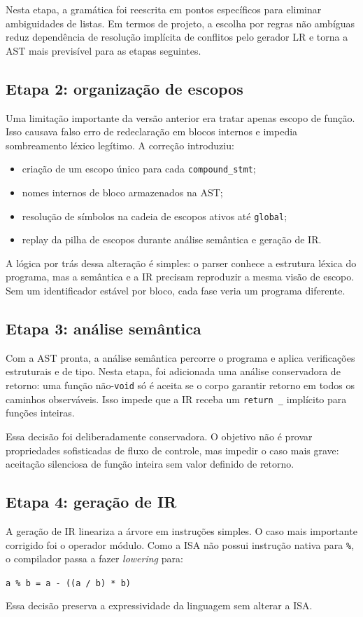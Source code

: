 \documentclass[12pt,a4paper]{article}
\begin{document}
Nesta etapa, a gramática foi reescrita em pontos específicos para eliminar ambiguidades de listas. Em termos de projeto, a escolha por regras não ambíguas reduz dependência de resolução implícita de conflitos pelo gerador LR e torna a AST mais previsível para as etapas seguintes.

\subsection{Etapa 2: organização de escopos}
Uma limitação importante da versão anterior era tratar apenas escopo de função. Isso causava falso erro de redeclaração em blocos internos e impedia sombreamento léxico legítimo. A correção introduziu:
\begin{itemize}[leftmargin=1.5em]
    \item criação de um escopo único para cada \texttt{compound\_stmt};
    \item nomes internos de bloco armazenados na AST;
    \item resolução de símbolos na cadeia de escopos ativos até \texttt{global};
    \item replay da pilha de escopos durante análise semântica e geração de IR.
\end{itemize}

A lógica por trás dessa alteração é simples: o parser conhece a estrutura léxica do programa, mas a semântica e a IR precisam reproduzir a mesma visão de escopo. Sem um identificador estável por bloco, cada fase veria um programa diferente.

\subsection{Etapa 3: análise semântica}
Com a AST pronta, a análise semântica percorre o programa e aplica verificações estruturais e de tipo. Nesta etapa, foi adicionada uma análise conservadora de retorno: uma função não-\texttt{void} só é aceita se o corpo garantir retorno em todos os caminhos observáveis. Isso impede que a IR receba um \texttt{return \_} implícito para funções inteiras.

Essa decisão foi deliberadamente conservadora. O objetivo não é provar propriedades sofisticadas de fluxo de controle, mas impedir o caso mais grave: aceitação silenciosa de função inteira sem valor definido de retorno.

\subsection{Etapa 4: geração de IR}
A geração de IR lineariza a árvore em instruções simples. O caso mais importante corrigido foi o operador módulo. Como a ISA não possui instrução nativa para \texttt{\%}, o compilador passa a fazer \emph{lowering} para:
\begin{center}
\texttt{a \% b = a - ((a / b) * b)}
\end{center}
Essa decisão preserva a expressividade da linguagem sem alterar a ISA.
\end{document}
